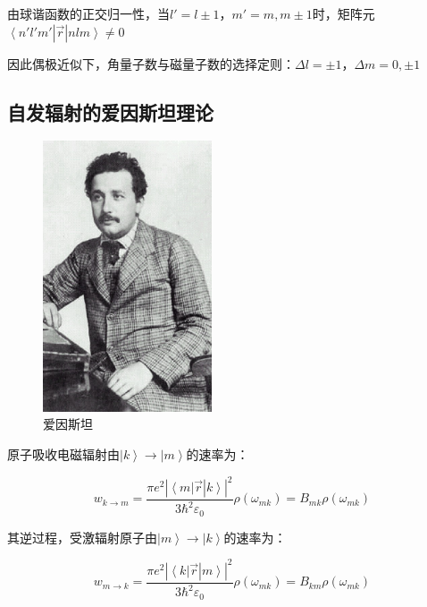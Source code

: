 由球谐函数的正交归一性，当$l' = l \pm 1$，$m' = m,m \pm
1$时，矩阵元$\left\langle {n'l'm'} \right.\left| {\vec r}
\right|\left. {nlm} \right\rangle  \ne 0$

因此偶极近似下，角量子数与磁量子数的选择定则：$\Delta l =  \pm 1$，$\Delta m = 0, \pm 1$


\subsection{自发辐射的爱因斯坦理论}

\begin{figure}[h]
\begin{center}
\includegraphics[clip,width=5cm]{Perturbation/einstein.ps}
\caption{爱因斯坦}
\end{center}
\end{figure}


原子吸收电磁辐射由$\left| k \right\rangle  \to \left| m \right\rangle $的速率为：

\begin{equation}\label{25-12}
w_{k \to m}  = \frac{{\pi e^2 | \left\langle m \right|\left. {\vec
r} \right|\left. k \right\rangle |^2 }}{{3\hbar ^2 \varepsilon _0
}}\rho (\omega _{mk} ) = B_{mk} \rho (\omega _{mk} )
\end{equation}

其逆过程，受激辐射原子由$\left| m \right\rangle  \to \left| k \right\rangle $的速率为：

\begin{equation}\label{25-13}
w_{m \to k}  = \frac{{\pi e^2 | \left\langle k \right|\left. {\vec
r} \right|\left. m \right\rangle |^2 }}{{3\hbar ^2 \varepsilon _0
}}\rho (\omega _{mk} ) = B_{km} \rho (\omega _{mk} )
\end{equation}

